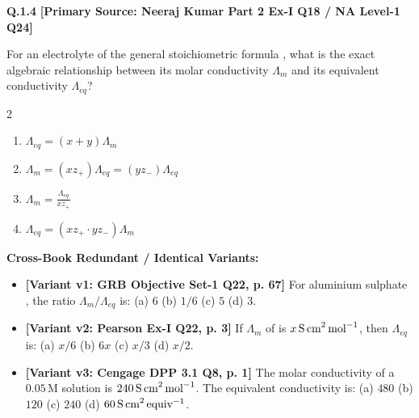 \begin{problembox}
\textbf{Q.1.4} \hfill \textbf{[Primary Source: Neeraj Kumar Part 2 Ex-I Q18 / NA Level-1 Q24]}
\label{q:qb-c1-04}

For an electrolyte of the general stoichiometric formula , what is the exact algebraic relationship between its molar conductivity $\Lambda_m$ and its equivalent conductivity $\Lambda_{eq}$?
\begin{multicols}{2}
\begin{enumerate}[label=(\alph*)]
    \item $\Lambda_{eq} = (x+y)\Lambda_m$
    \item $\Lambda_m = (x z_+)\Lambda_{eq} = (y z_-)\Lambda_{eq}$
    \item $\Lambda_m = \frac{\Lambda_{eq}}{x z_+}$
    \item $\Lambda_{eq} = (x z_+ \cdot y z_-)\Lambda_m$
\end{enumerate}
\end{multicols}

\tcbline
\textbf{\color{accentamber}Cross-Book Redundant / Identical Variants:}
\begin{itemize}[leftmargin=*,itemsep=2pt]
    \item \textbf{[Variant v1: GRB Objective Set-1 Q22, p. 67]} For aluminium sulphate , the ratio $\Lambda_m / \Lambda_{eq}$ is: (a) $6$ (b) $1/6$ (c) $5$ (d) $3$.
    \item \textbf{[Variant v2: Pearson Ex-I Q22, p. 3]} If $\Lambda_m$ of  is $x\,\text{S\,cm}^2\,\text{mol}^{-1}$, then $\Lambda_{eq}$ is: (a) $x/6$ (b) $6x$ (c) $x/3$ (d) $x/2$.
    \item \textbf{[Variant v3: Cengage DPP 3.1 Q8, p. 1]} The molar conductivity of a $0.05\,\text{M}$  solution is $240\,\text{S\,cm}^2\,\text{mol}^{-1}$. The equivalent conductivity is: (a) $480$ (b) $120$ (c) $240$ (d) $60\,\text{S\,cm}^2\,\text{equiv}^{-1}$.
\end{itemize}
\end{problembox}

